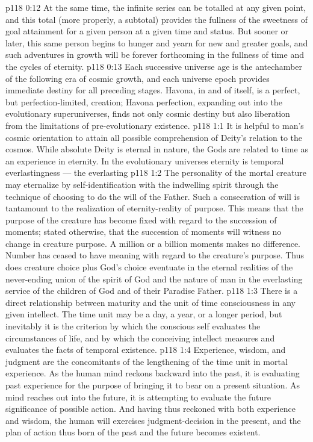 \vs p118 0:12 At the same time, the infinite series can be totalled at any given point, and this total (more properly, a subtotal) provides the fullness of the sweetness of goal attainment for a given person at a given time and status. But sooner or later, this same person begins to hunger and yearn for new and greater goals, and such adventures in growth will be forever forthcoming in the fullness of time and the cycles of eternity.
\vs p118 0:13 Each successive universe age is the antechamber of the following era of cosmic growth, and each universe epoch provides immediate destiny for all preceding stages. Havona, in and of itself, is a perfect, but perfection\hyp{}limited, creation; Havona perfection, expanding out into the evolutionary superuniverses, finds not only cosmic destiny but also liberation from the limitations of pre\hyp{}evolutionary existence.
\vs p118 1:1 It is helpful to man’s cosmic orientation to attain all possible comprehension of Deity’s relation to the cosmos. While absolute Deity is eternal in nature, the Gods are related to time as an experience in eternity. In the evolutionary universes eternity is temporal everlastingness --- the everlasting 
\vs p118 1:2 \pc The personality of the mortal creature may eternalize by self\hyp{}identification with the indwelling spirit through the technique of choosing to do the will of the Father. Such a consecration of will is tantamount to the realization of eternity\hyp{}reality of purpose. This means that the purpose of the creature has become fixed with regard to the succession of moments; stated otherwise, that the succession of moments will witness no change in creature purpose. A million or a billion moments makes no difference. Number has ceased to have meaning with regard to the creature’s purpose. Thus does creature choice plus God’s choice eventuate in the eternal realities of the never\hyp{}ending union of the spirit of God and the nature of man in the everlasting service of the children of God and of their Paradise Father.
\vs p118 1:3 There is a direct relationship between maturity and the unit of time consciousness in any given intellect. The time unit may be a day, a year, or a longer period, but inevitably it is the criterion by which the conscious self evaluates the circumstances of life, and by which the conceiving intellect measures and evaluates the facts of temporal existence.
\vs p118 1:4 Experience, wisdom, and judgment are the concomitants of the lengthening of the time unit in mortal experience. As the human mind reckons backward into the past, it is evaluating past experience for the purpose of bringing it to bear on a present situation. As mind reaches out into the future, it is attempting to evaluate the future significance of possible action. And having thus reckoned with both experience and wisdom, the human will exercises judgment\hyp{}decision in the present, and the plan of action thus born of the past and the future becomes existent.
